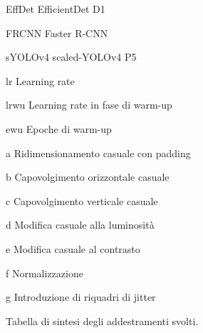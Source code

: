 \begin{table}[h]
\begin{threeparttable}
        \begin{tablenotes}[online]
            \item [EffDet] EfficientDet D1
            \item [FRCNN] Faster R-CNN
            \item [sYOLOv4] scaled-YOLOv4 P5
            \item [lr] Learning rate
            \item [lrwu] Learning rate in fase di warm-up
            \item [ewu] Epoche di warm-up
            \item [a] Ridimensionamento casuale con padding
            \item [b] Capovolgimento orizzontale casuale
            \item [c] Capovolgimento verticale casuale
            \item [d] Modifica casuale alla luminosità
            \item [e] Modifica casuale al contrasto
            \item [f] Normalizzazione
            \item [g] Introduzione di riquadri di jitter
        \end{tablenotes}

        \caption{Tabella di sintesi degli addestramenti svolti.}
        \label{tab:appendix_results}
    \end{threeparttable}
\end{table}